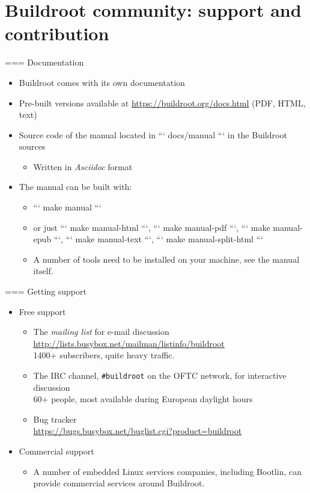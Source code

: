 \section{Buildroot community: support and contribution}

=== {Documentation}
  \begin{itemize}
  \item Buildroot comes with its own documentation
  \item Pre-built versions available at
    \url{https://buildroot.org/docs.html} (PDF, HTML, text)
  \item Source code of the manual located in ``` docs/manual ``` in the
    Buildroot sources
    \begin{itemize}
    \item Written in {\em Asciidoc} format
    \end{itemize}
  \item The manual can be built with:
    \begin{itemize}
    \item ``` make manual ```
    \item or just ``` make manual-html ```, ``` make manual-pdf ```, ``` make manual-epub ```, ``` make manual-text ```, ``` make manual-split-html ```
    \item A number of tools need to be installed on your machine,
      see the manual itself.
    \end{itemize}
  \end{itemize}


=== {Getting support}
  \begin{itemize}
  \item Free support
    \begin{itemize}
    \item The {\em mailing list} for e-mail discussion\\
      {\footnotesize \url{http://lists.busybox.net/mailman/listinfo/buildroot}}\\
      1400+ subscribers, quite heavy traffic.
    \item The IRC channel, {\tt \#buildroot} on the OFTC network,
      for interactive discussion\\
      60+ people, most available during European daylight hours
    \item Bug tracker\\
      \url{https://bugs.busybox.net/buglist.cgi?product=buildroot}
    \end{itemize}
  \item Commercial support
    \begin{itemize}
    \item A number of embedded Linux services companies, including
      Bootlin, can provide commercial services around
      Buildroot.
    \end{itemize}
  \end{itemize}


